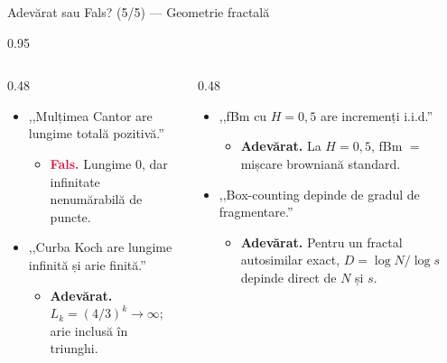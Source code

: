 \documentclass[9pt, aspectratio=169, t]{beamer}
\begin{document}
\begin{frame}[shrink=15]{Adevărat sau Fals? (5/5) --- Geometrie fractală}
\begin{cminipage}{0.95\textwidth}
\begin{columns}[T]
\begin{column}{0.48\textwidth}
\begin{itemize}\setlength{\itemsep}{2pt}
    \item ,,Mulțimea Cantor are lungime totală pozitivă.''
    \begin{itemize}\setlength{\itemsep}{0pt}
        \item[] \textcolor{Crimson}{\textbf{Fals.}} Lungime $0$, dar infinitate nenumărabilă de puncte.
    \end{itemize}
    \item ,,Curba Koch are lungime infinită și arie finită.''
    \begin{itemize}\setlength{\itemsep}{0pt}
        \item[] \textcolor{Forest}{\textbf{Adevărat.}} $L_k=(4/3)^k\to\infty$; arie inclusă în triunghi.
    \end{itemize}
\end{itemize}
\end{column}
\begin{column}{0.48\textwidth}
\begin{itemize}\setlength{\itemsep}{2pt}
    \item ,,fBm cu $H=0{,}5$ are incremenți i.i.d.''
    \begin{itemize}\setlength{\itemsep}{0pt}
        \item[] \textcolor{Forest}{\textbf{Adevărat.}} La $H=0{,}5$, fBm $=$ mișcare browniană standard.
    \end{itemize}
    \item ,,Box-counting depinde de gradul de fragmentare.''
    \begin{itemize}\setlength{\itemsep}{0pt}
        \item[] \textcolor{Forest}{\textbf{Adevărat.}} Pentru un fractal autosimilar exact, $D=\log N/\log s$ depinde direct de $N$ și $s$.
    \end{itemize}
\end{itemize}
\end{column}
\end{columns}
\end{cminipage}
\end{frame}
\end{document}
